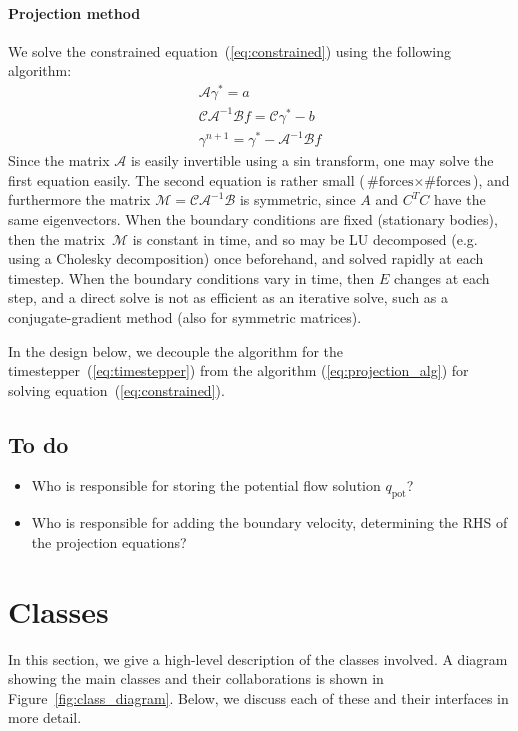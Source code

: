 \documentclass[11pt]{article}
\begin{document}
\paragraph{Projection method}
We solve the constrained equation~(\ref{eq:constrained}) using the following algorithm:
\begin{equation}
\begin{aligned}
	\mathcal{A}\gamma^* = a\\
	\mathcal{CA}^{-1}\mathcal{B}f = \mathcal{C}\gamma^* - b\\
	\gamma^{n+1} = \gamma^* - \mathcal{A}^{-1}\mathcal{B}f
\end{aligned}
\label{eq:projection_alg}
\end{equation}
Since the matrix $\mathcal{A}$ is easily invertible using a sin transform, one may solve the first equation easily.  The second equation is rather small ($\text{\#forces} \times \text{\#forces}$), and furthermore the matrix $\mathcal{M}=\mathcal{C}\mathcal{A}^{-1}\mathcal{B}$ is symmetric, since $A$ and $C^TC$ have the same eigenvectors.  When the boundary conditions are fixed (stationary bodies), then the matrix~$\mathcal{M}$ is constant in time, and so may be LU decomposed (e.g. using a Cholesky decomposition) once beforehand, and solved rapidly at each timestep.  When the boundary conditions vary in time, then $E$ changes at each step, and a direct solve is not as efficient as an iterative solve, such as a conjugate-gradient method (also for symmetric matrices).

In the design below, we decouple the algorithm for the timestepper~(\ref{eq:timestepper}) from the algorithm (\ref{eq:projection_alg}) for solving equation~(\ref{eq:constrained}).

\subsection{To do}
\begin{itemize}
	\item Who is responsible for storing the potential flow solution $q_\text{pot}$?
	\item Who is responsible for adding the boundary velocity, determining the RHS of the projection equations?
\end{itemize}

\section{Classes}
In this section, we give a high-level description of the classes involved.  A diagram showing the main classes and their collaborations is shown in Figure~\ref{fig:class_diagram}.  Below, we discuss each of these and their interfaces in more detail.
\end{document}
